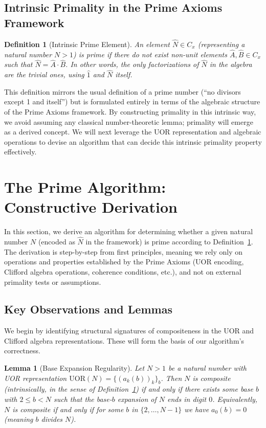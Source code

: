 \documentclass[11pt]{article}
\newtheorem{definition}{Definition}
\newtheorem{lemma}{Lemma}
\begin{document}
\subsection{Intrinsic Primality in the Prime Axioms Framework}
\begin{definition}[Intrinsic Prime Element]\label{def:prime}
An element $\hat{N}\in C_x$ (representing a natural number $N>1$) is \emph{prime} if there do not exist non-unit elements $\hat{A}, \hat{B}\in C_x$ such that $\hat{N} = \hat{A}\cdot \hat{B}$. In other words, the only factorizations of $\hat{N}$ in the algebra are the trivial ones, using $\hat{1}$ and $\hat{N}$ itself.
\end{definition}

This definition mirrors the usual definition of a prime number (“no divisors except 1 and itself”) but is formulated entirely in terms of the algebraic structure of the Prime Axioms framework. By constructing primality in this intrinsic way, we avoid assuming any classical number-theoretic lemma; primality will emerge as a derived concept. We will next leverage the UOR representation and algebraic operations to devise an algorithm that can decide this intrinsic primality property effectively.

\section{The Prime Algorithm: Constructive Derivation}
In this section, we derive an algorithm for determining whether a given natural number $N$ (encoded as $\hat{N}$ in the framework) is prime according to Definition~\ref{def:prime}. The derivation is step-by-step from first principles, meaning we rely only on operations and properties established by the Prime Axioms (UOR encoding, Clifford algebra operations, coherence conditions, etc.), and not on external primality tests or assumptions.

\subsection{Key Observations and Lemmas}
We begin by identifying structural signatures of compositeness in the UOR and Clifford algebra representations. These will form the basis of our algorithm’s correctness.

\begin{lemma}[Base Expansion Regularity]\label{lem:base-regularity}
Let $N>1$ be a natural number with UOR representation $\mathrm{UOR}(N) = \{(a_k(b))_k\}_b$. Then $N$ is composite (intrinsically, in the sense of Definition~\ref{def:prime}) if and only if there exists some base $b$ with $2 \le b < N$ such that the base-$b$ expansion of $N$ ends in digit $0$. Equivalently, $N$ is composite if and only if for some $b$ in $\{2,\dots,N-1\}$ we have $a_0(b) = 0$ (meaning $b$ divides $N$). 
\end{lemma}
\end{document}

